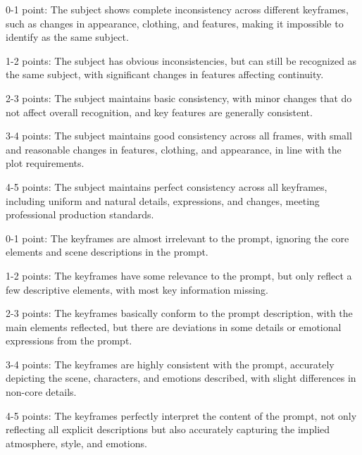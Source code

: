 \begin{prompt}[title={Subject Consistency}, label=SC]
0-1 point: The subject shows complete inconsistency across different keyframes, such as changes in appearance, clothing, and features, making it impossible to identify as the same subject.

1-2 points: The subject has obvious inconsistencies, but can still be recognized as the same subject, with significant changes in features affecting continuity.

2-3 points: The subject maintains basic consistency, with minor changes that do not affect overall recognition, and key features are generally consistent.

3-4 points: The subject maintains good consistency across all frames, with small and reasonable changes in features, clothing, and appearance, in line with the plot requirements.

4-5 points: The subject maintains perfect consistency across all keyframes, including uniform and natural details, expressions, and changes, meeting professional production standards.
\end{prompt}



\begin{prompt}[title={Prompt-Frame Alignment}, label=PFA]
0-1 point: The keyframes are almost irrelevant to the prompt, ignoring the core elements and scene descriptions in the prompt.

1-2 points: The keyframes have some relevance to the prompt, but only reflect a few descriptive elements, with most key information missing.

2-3 points: The keyframes basically conform to the prompt description, with the main elements reflected, but there are deviations in some details or emotional expressions from the prompt.

3-4 points: The keyframes are highly consistent with the prompt, accurately depicting the scene, characters, and emotions described, with slight differences in non-core details.

4-5 points: The keyframes perfectly interpret the content of the prompt, not only reflecting all explicit descriptions but also accurately capturing the implied atmosphere, style, and emotions.
\end{prompt}





